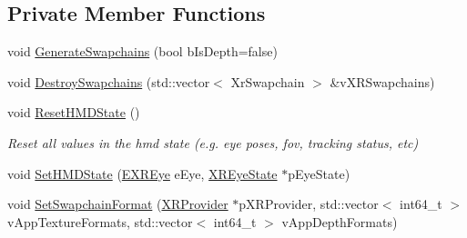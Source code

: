 \subsection*{Private Member Functions}
\begin{DoxyCompactItemize}
\item 
void \mbox{\hyperlink{class_open_x_r_provider_1_1_x_r_render_manager_a20c0a78fcd0d2a2135d878202d932a06}{Generate\+Swapchains}} (bool b\+Is\+Depth=false)
\item 
void \mbox{\hyperlink{class_open_x_r_provider_1_1_x_r_render_manager_af2615e2a53735d24df7a641e550bd800}{Destroy\+Swapchains}} (std\+::vector$<$ Xr\+Swapchain $>$ \&v\+X\+R\+Swapchains)
\item 
void \mbox{\hyperlink{class_open_x_r_provider_1_1_x_r_render_manager_ab3dbed1a6e82b338e948def236adbf7b}{Reset\+H\+M\+D\+State}} ()
\begin{DoxyCompactList}\small\item\em Reset all values in the hmd state (e.\+g. eye poses, fov, tracking status, etc) \end{DoxyCompactList}\item 
void \mbox{\hyperlink{class_open_x_r_provider_1_1_x_r_render_manager_ab9e9d2271f8c7e2740dad5e99c92343c}{Set\+H\+M\+D\+State}} (\mbox{\hyperlink{namespace_open_x_r_provider_a8aa379869e30772896e6c468eb54f155}{E\+X\+R\+Eye}} e\+Eye, \mbox{\hyperlink{struct_open_x_r_provider_1_1_x_r_eye_state}{X\+R\+Eye\+State}} $\ast$p\+Eye\+State)
\item 
void \mbox{\hyperlink{class_open_x_r_provider_1_1_x_r_render_manager_aece52449fd883fbdefa6de5cb79d2474}{Set\+Swapchain\+Format}} (\mbox{\hyperlink{class_open_x_r_provider_1_1_x_r_provider}{X\+R\+Provider}} $\ast$p\+X\+R\+Provider, std\+::vector$<$ int64\+\_\+t $>$ v\+App\+Texture\+Formats, std\+::vector$<$ int64\+\_\+t $>$ v\+App\+Depth\+Formats)
\end{DoxyCompactItemize}
